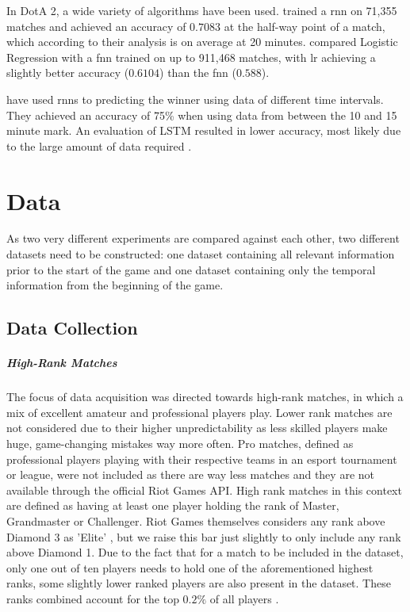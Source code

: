 \documentclass[12pt, a4paper, headinclude, twoside, plainheadsepline, open=right, numbers=noenddot, hidelinks, toc=listof, toc=bibliography]{scrreprt}
\begin{document}
In DotA 2, a wide variety of algorithms have been used.  
 \cite{yuMOBASliceTimeSlice2018} trained a \ac{rnn} on 71,355 matches and achieved an accuracy of $0.7083$ at the half-way point of a match, which according to their analysis is on average at 20 minutes.
 \cite{wangPredictingMultiplayerOnline2016} compared Logistic Regression with a \ac{fnn} trained on up to 911,468 matches, with \ac{lr} achieving a slightly better accuracy ($0.6104$) than the \ac{fnn} ($0.588$).


 have used \acp{rnn} to predicting the winner using data of different time intervals. They achieved an accuracy of 75\% when using data from between the 10 and 15 minute mark.
An evaluation of LSTM resulted in lower accuracy, most likely due to the large amount of data required \cite{silvaContinuousOutcomePrediction2018}.






\chapter{Data}
\label{chap:data}

As two very different experiments are compared against each other, two different datasets need to be constructed: one dataset containing all relevant information prior to the start of the game and one dataset containing only the temporal information from the beginning of the game.


\section{Data Collection}
\label{sec:datacoll}

\paragraph{High-Rank Matches}
The focus of data acquisition was directed towards high-rank matches, in which a mix of excellent amateur and professional players play.
Lower rank matches are not considered due to their higher unpredictability as less skilled players make huge, game-changing mistakes way more often.
Pro matches, defined as professional players playing with their respective teams in an esport tournament or league, were not included as there are way less matches and they are not available through the official Riot Games API.
High rank matches in this context are defined as having at least one player holding the rank of Master, Grandmaster or Challenger.
Riot Games themselves considers any rank above Diamond 3 as 'Elite' \cite{riotgamesDevBalanceFramework2020}, but we raise this bar just slightly to only include any rank above Diamond 1.
Due to the fact that for a match to be included in the dataset, only one out of ten players needs to hold one of the aforementioned highest ranks, some slightly lower ranked players are also present in the dataset.
These ranks combined account for the top $0.2\%$ of all players \cite{riotgamesRankedTiersDivisions2023}.
\end{document}

